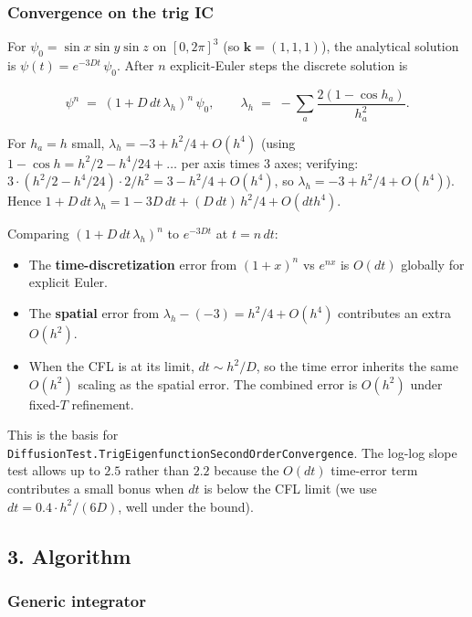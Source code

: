 \subsubsection{Convergence on the trig
IC}\label{convergence-on-the-trig-ic}

For \(\psi_0 = \sin x \sin y \sin z\) on \([0, 2\pi]^3\) (so
\(\mathbf{k} =
(1, 1, 1)\)), the analytical solution is
\(\psi(t) = e^{-3 D t}\,\psi_0\). After \(n\) explicit-Euler steps the
discrete solution is

\[
\psi^n \;=\; (1 + D\,dt\,\lambda_h)^n\,\psi_0, \qquad \lambda_h \;=\; -\sum_a \frac{2(1 - \cos h_a)}{h_a^2}.
\]

For \(h_a = h\) small, \(\lambda_h = -3 + h^2/4 + O(h^4)\) (using
\(1 - \cos h = h^2/2 - h^4/24 + \ldots\) per axis times 3 axes;
verifying:
\(3 \cdot (h^2/2 - h^4/24) \cdot 2/h^2 = 3 - h^2/4 + O(h^4)\), so
\(\lambda_h = -3 + h^2/4 + O(h^4)\)). Hence
\(1 + D\,dt\,\lambda_h = 1 - 3 D\,dt + (D\,dt)\,h^2/4 + O(dt h^4)\).

Comparing \((1 + D\,dt\,\lambda_h)^n\) to \(e^{-3 D t}\) at
\(t = n\,dt\):

\begin{itemize}
\tightlist
\item
  The \textbf{time-discretization} error from \((1 + x)^n\) vs
  \(e^{n x}\) is \(O(dt)\) globally for explicit Euler.
\item
  The \textbf{spatial} error from \(\lambda_h - (-3) = h^2/4 + O(h^4)\)
  contributes an extra \(O(h^2)\).
\item
  When the CFL is at its limit, \(dt \sim h^2/D\), so the time error
  inherits the same \(O(h^2)\) scaling as the spatial error. The
  combined error is \textbf{\(O(h^2)\)} under fixed-\(T\) refinement.
\end{itemize}

This is the basis for
\passthrough{\lstinline!DiffusionTest.TrigEigenfunctionSecondOrderConvergence!}.
The log-log slope test allows up to \(2.5\) rather than \(2.2\) because
the \(O(dt)\) time-error term contributes a small bonus when \(dt\) is
below the CFL limit (we use \(dt = 0.4 \cdot h^2/(6D)\), well under the
bound).

\subsection{3. Algorithm}\label{algorithm}

\subsubsection{Generic integrator}\label{generic-integrator}


